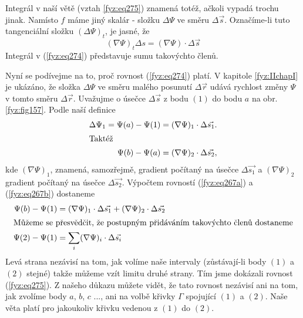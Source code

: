     Integrál v naší větě (vztah \ref{fyz:eq275}) znamená totéž, ačkoli vypadá trochu jinak. Namísto 
    \(f\) máme jiný skalár - složku \(\Delta\Psi\) ve směru \(\Delta\vec{s}\). Označíme-li tuto 
    tangenciální složku \((\Delta\Psi)_t\), je jasné, že
    \begin{equation}\label{fyz:eq274}
      (\nabla\Psi)_t\Delta s = (\nabla\Psi)\cdot\Delta\vec{s}
    \end{equation}
    Integrál v (\ref{fyz:eq274}) představuje sumu takovýchto členů.
    
    Nyní se podívejme na to, proč rovnost (\ref{fyz:eq274}) platí. V kapitole   
    \ref{fyz:IIchapI} je ukázáno, že složka \(\Delta\Psi\) ve směru malého posunutí 
    \(\Delta\vec{r}\) udává rychlost změny \(\Psi\) v tomto směru \(\Delta\vec{r}\). Uvažujme o 
    úsečce \(\Delta\vec{s}\) z bodu \((1)\) do bodu \(a\) na obr. \ref{fyz:fig157}. Podle 
    naší definice  
    \begin{align}
     \Delta\Psi_1 = \Psi(a) - \Psi(1) 
       &= (\nabla\Psi)_1\cdot\Delta\vec{s_1}.         \label{fyz:eq267a}  \\
     \shortintertext{Taktéž}
     \Psi(b) - \Psi(a)
       &= (\nabla\Psi)_2\cdot\Delta\vec{s_2},         \label{fyz:eq267b}
    \end{align}
    kde \((\nabla\Psi)_1\), znamená, samozřejmě, gradient počítaný na úsečce \(\Delta\vec{s_1}\) a 
    \((\nabla\Psi)_2\) gradient počítaný na úsečce \(\Delta\vec{s_2}\). Výpočtem rovností 
    (\ref{fyz:eq267a}) a (\ref{fyz:eq267b}) dostaneme
    \begin{align}
     \Psi(b) - \Psi(1)              &= 
        (\nabla\Psi)_1\cdot\Delta\vec{s_1} + 
        (\nabla\Psi)_2\cdot\Delta\vec{s_2}               \label{fyz:eq268a} \\
     \shortintertext{Můžeme se přesvědčit, že postupným přidáváním takovýchto členů dostaneme}
     \Psi(2) - \Psi(1)              &= 
       \sum_i(\nabla\Psi)_i\cdot\Delta\vec{s_i}          \label{fyz:eq268b}
    \end{align}
    Levá strana nezávisí na tom, jak volíme naše intervaly (zů\-stá\-va\-jí-li body \((1)\) a 
    \((2)\) stejné) takže můžeme vzít limitu druhé strany. Tím jsme dokázali rovnost 
    (\ref{fyz:eq275}). Z našeho důkazu můžete vidět, že tato rovnost nezávisí ani na 
    tom, jak zvolíme body \(a\), \(b\), \(c\) ..., ani na volbě křivky \(\Gamma\) spojující \((1)\) 
    a \((2)\). Naše věta platí pro jakoukoliv křivku vedenou z \((1)\) do \((2)\).
    
